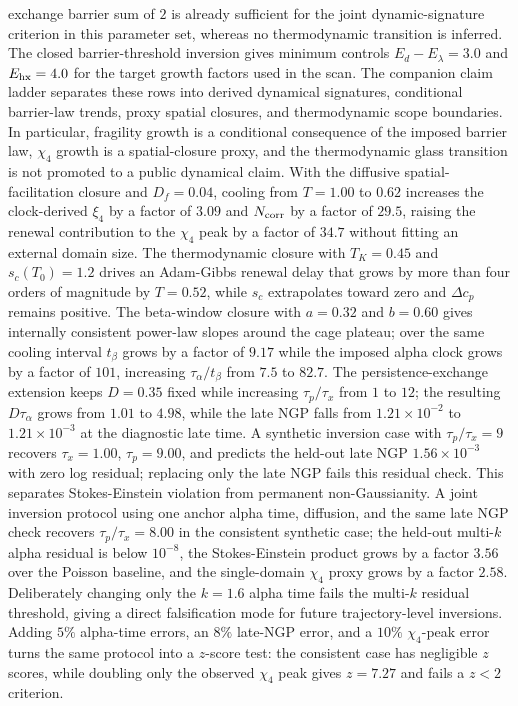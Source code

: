 \documentclass[aps,preprint,onecolumn,superscriptaddress,nofootinbib]{revtex4-2}
\begin{document}
exchange barrier sum of $2$ is already sufficient for the joint
dynamic-signature criterion in this parameter set, whereas no thermodynamic transition is
inferred. The closed barrier-threshold inversion gives minimum controls
$E_d-E_\lambda=3.0$ and $E_{\rm hx}=4.0$ for the target growth factors used in
the scan.
The companion claim ladder separates these rows into derived dynamical
signatures, conditional barrier-law trends, proxy spatial closures, and
thermodynamic scope boundaries. In particular, fragility growth is a
conditional consequence of the imposed barrier law, \(\chi_4\) growth is a
spatial-closure proxy, and the thermodynamic glass transition is not promoted
to a public dynamical claim.
With the diffusive spatial-facilitation closure and $D_f=0.04$, cooling from
$T=1.00$ to $0.62$ increases the clock-derived $\xi_4$ by a factor of $3.09$
and $N_{\rm corr}$ by a factor of $29.5$, raising the renewal contribution to
the $\chi_4$ peak by a factor of $34.7$ without fitting an external domain
size.
The thermodynamic closure with $T_K=0.45$ and $s_c(T_0)=1.2$ drives an
Adam-Gibbs renewal delay that grows by more than four orders of magnitude by
$T=0.52$, while $s_c$ extrapolates toward zero and $\Delta c_p$ remains
positive.
The beta-window closure with $a=0.32$ and $b=0.60$ gives internally consistent
power-law slopes around the cage plateau; over the same cooling interval
$t_\beta$ grows by a factor of $9.17$ while the imposed alpha clock grows by a
factor of $101$, increasing $\tau_\alpha/t_\beta$ from $7.5$ to $82.7$.
The persistence-exchange extension keeps $D=0.35$ fixed while increasing
$\tau_p/\tau_x$ from $1$ to $12$; the resulting $D\tau_\alpha$ grows from
$1.01$ to $4.98$, while the late NGP falls from $1.21\times10^{-2}$ to
$1.21\times10^{-3}$ at the diagnostic late time. A synthetic inversion case
with $\tau_p/\tau_x=9$ recovers $\tau_x=1.00$, $\tau_p=9.00$, and predicts the
held-out late NGP $1.56\times10^{-3}$ with zero log residual; replacing only
the late NGP fails this residual check. This separates Stokes-Einstein
violation from permanent non-Gaussianity.
A joint inversion protocol using one anchor alpha time, diffusion, and the same
late NGP check recovers $\tau_p/\tau_x=8.00$ in the consistent synthetic case;
the held-out multi-$k$ alpha residual is below $10^{-8}$, the
Stokes-Einstein product grows by a factor $3.56$ over the Poisson baseline, and
the single-domain $\chi_4$ proxy grows by a factor $2.58$. Deliberately
changing only the $k=1.6$ alpha time fails the multi-$k$ residual threshold,
giving a direct falsification mode for future trajectory-level inversions.
Adding $5\%$ alpha-time errors, an $8\%$ late-NGP error, and a $10\%$
$\chi_4$-peak error turns the same protocol into a $z$-score test: the
consistent case has negligible $z$ scores, while doubling only the observed
$\chi_4$ peak gives $z=7.27$ and fails a $z<2$ criterion.
\end{document}
